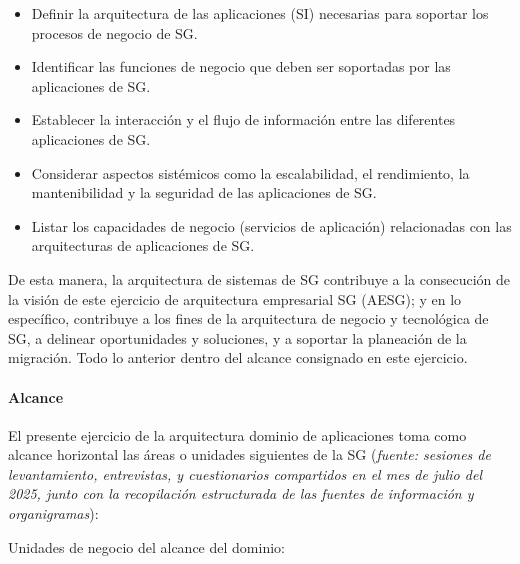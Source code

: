 \documentclass[
	a4paper, %
	12pt, %
]{include/CSSullivanBusinessReport}
\def\tightlist{}
\begin{document}
\begin{itemize}
\tightlist
\item
  Definir la arquitectura de las aplicaciones (SI) necesarias para
  soportar los procesos de negocio de SG.
\item
  Identificar las funciones de negocio que deben ser soportadas por las
  aplicaciones de SG.
\item
  Establecer la interacción y el flujo de información entre las
  diferentes aplicaciones de SG.
\item
  Considerar aspectos sistémicos como la escalabilidad, el rendimiento,
  la mantenibilidad y la seguridad de las aplicaciones de SG.
\item
  Listar los capacidades de negocio (servicios de aplicación)
  relacionadas con las arquitecturas de aplicaciones de SG.
\end{itemize}

De esta manera, la arquitectura de sistemas de SG contribuye a la
consecución de la visión de este ejercicio de arquitectura empresarial
SG (AESG); y en lo específico, contribuye a los fines de la arquitectura
de negocio y tecnológica de SG, a delinear oportunidades y soluciones, y
a soportar la planeación de la migración. Todo lo anterior dentro del
alcance consignado en este ejercicio.

\paragraph{Alcance}\label{sec:alcance}

El presente ejercicio de la arquitectura dominio de aplicaciones toma
como alcance horizontal las áreas o unidades siguientes de la SG
(\emph{fuente: sesiones de levantamiento, entrevistas, y cuestionarios
compartidos en el mes de julio del 2025, junto con la recopilación
estructurada de las fuentes de información y organigramas}):

Unidades de negocio del alcance del dominio:
\end{document}
